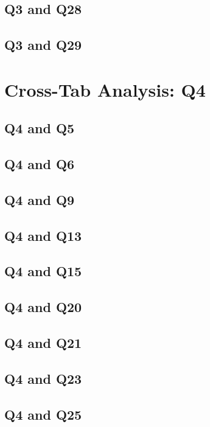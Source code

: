 \documentclass{report}
\begin{document}
\section{Q3 and Q28}\clearpage
\section{Q3 and Q29}\clearpage

\chapter{Cross-Tab Analysis: Q4}

\section{Q4 and Q5}\clearpage
\section{Q4 and Q6}\clearpage
\section{Q4 and Q9}\clearpage
\section{Q4 and Q13}\clearpage
\section{Q4 and Q15}\clearpage
\section{Q4 and Q20}\clearpage
\section{Q4 and Q21}\clearpage
\section{Q4 and Q23}\clearpage
\section{Q4 and Q25}\clearpage
\end{document}
